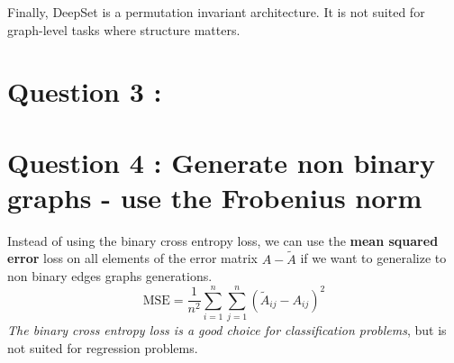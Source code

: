 \documentclass[a4paper]{article}
\begin{document}
Finally, DeepSet is a permutation invariant architecture. It is not suited for graph-level tasks where structure matters.


\section*{Question 3 : }

\section*{Question 4 : Generate non binary graphs - use the Frobenius norm}
Instead of using the binary cross entropy loss, we can use the \textbf{mean squared error} loss on all elements of the error matrix $A-\tilde{A}$ if we want to generalize to non binary edges graphs generations.
$$\text{MSE} = \frac{1}{n^2} \sum_{i=1}^n \sum_{j=1}^n (\tilde{A}_{ij} - A_{ij})^2$$
\textit{The binary cross entropy loss is a good choice for classification problems}, but is not suited for regression problems.






\end{document}
